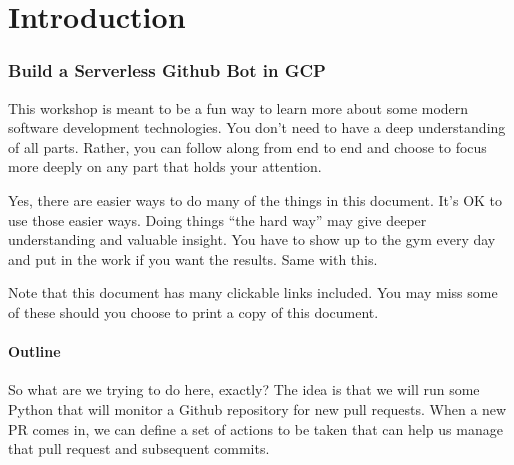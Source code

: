 






\tableofcontents
\clearpage
\listoffigures
\listoftables
\clearpage
\part{Introduction}

\section{\label{sec:Start}Build a Serverless Github Bot in GCP}
\vspace{2mm}

\justifying
This workshop is meant to be a fun way to learn more about some modern software development technologies.
You don't need to have a deep understanding of all parts. Rather, you can follow along from end to end
and choose to focus more deeply on any part that holds your attention.
\vspace{2mm}

\justifying
Yes, there are easier ways to do many of the things in this document. It's OK to use those easier ways.
Doing things ``the hard way'' may give deeper understanding and valuable insight. You have to show
up to the gym every day and put in the work if you want the results. Same with this.
\vspace{2mm}

\justifying
Note that this document has many clickable links included. You may miss some of these should you choose
to print a copy of this document.
\vspace{2mm}


\subsection{\label{sec:outline}Outline}

\justifying
So what are we trying to do here, exactly? The idea is that we will run some Python that will monitor
a Github repository for new pull requests. When a new PR comes in, we can define a set of actions to
be taken that can help us manage that pull request and subsequent commits.
\vspace{2mm}

